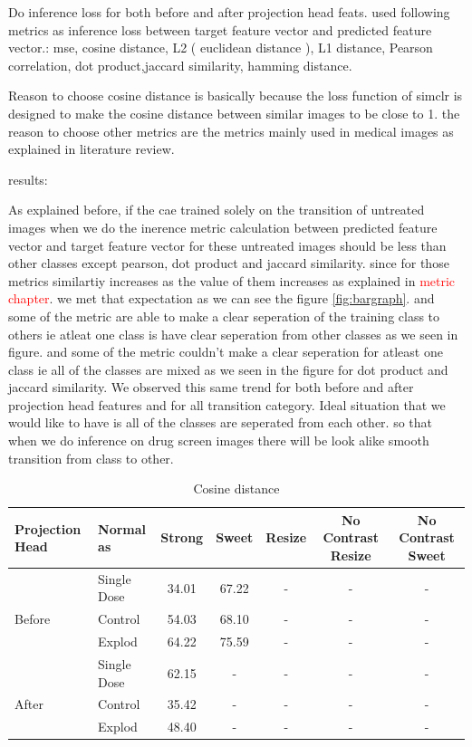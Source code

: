 Do inference loss for both  before and after projection head feats.
used following metrics as inference loss between target feature vector and predicted feature vector.: mse, cosine distance, L2 ( euclidean distance ), L1 distance, Pearson correlation, dot product,jaccard similarity, hamming distance.

Reason to choose cosine distance is basically because the loss function of simclr is designed to make the cosine distance between similar images to be close to 1. the reason to choose other metrics are the metrics mainly used in medical images as explained in literature review.


results:

As explained before, if the cae trained solely on the transition of untreated images when we do the inerence metric calculation between predicted feature vector and target feature vector for these untreated images should be less than other classes  except pearson, dot product and jaccard similarity. since for those metrics similartiy increases as the value of them increases as explained in \textcolor{red}{ metric chapter}. we met that expectation as we can see the figure \ref{fig:bargraph}.  and some of the metric are able to make a clear seperation of the training class to others ie atleat one class is have clear seperation from other classes as we seen in figure. and some of the metric couldn't make a clear seperation for atleast one class ie all of the classes are mixed as we seen in the figure for dot product and jaccard similarity. We observed this same trend  for both before and after projection head features and for all transition category. Ideal situation that we would like to have is all of the classes are seperated from each other. so that when we do inference on drug screen images there will be look alike smooth transition from class to other.

\begin{table}[H]
  \centering
  \begin{tabular}{@{}llccccc@{}}
  \toprule
  Projection Head & Normal as       & Strong & Sweet & Resize & No Contrast Resize & No Contrast Sweet \\ \midrule
                  & Single Dose    & 34.01      & 67.22     & -      & -                  & -                 \\
  Before          & Control        & 54.03      & 68.10     & -      & -                  & -                 \\
                  & Explod         & 64.22      & 75.59     & -      & -                  & -                 \\ \midrule
                  & Single Dose    & 62.15      & -     & -      & -                  & -                 \\
  After           & Control        & 35.42      & -     & -      & -                  & -                 \\
                  & Explod         & 48.40      & -     & -      & -                  & -                 \\ \bottomrule
  \end{tabular}
  \caption{Cosine distance}
  \label{tab:table_label}
\end{table}

